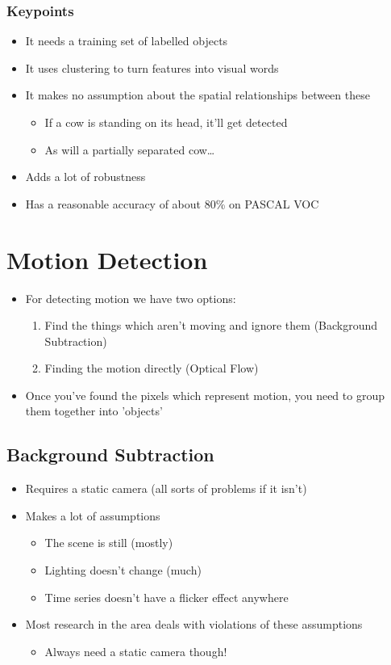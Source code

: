 \documentclass[a4paper]{article}
\begin{document}
\subsubsection{Keypoints}
\label{sec-3-5-1}
\begin{itemize}
\item It needs a training set of labelled objects
\item It uses clustering to turn features into visual words
\item It makes no assumption about the spatial relationships between these
\begin{itemize}
\item If a cow is standing on its head, it'll get detected
\item As will a partially separated cow\ldots{}
\end{itemize}
\item Adds a lot of robustness
\item Has a reasonable accuracy of about 80\% on PASCAL VOC
\end{itemize}

\section{Motion Detection}
\label{sec-4}
\begin{itemize}
\item For detecting motion we have two options:
\begin{enumerate}
\item Find the things which aren't moving and ignore them (Background Subtraction)
\item Finding the motion directly (Optical Flow)
\end{enumerate}
\item Once you've found the pixels which represent motion, you need to group them together into 'objects'
\end{itemize}

\subsection{Background Subtraction}
\label{sec-4-1}
\begin{itemize}
\item Requires a static camera (all sorts of problems if it isn't)
\item Makes a lot of assumptions
\begin{itemize}
\item The scene is still (mostly)
\item Lighting doesn't change (much)
\item Time series doesn't have a flicker effect anywhere
\end{itemize}
\item Most research in the area deals with violations of these assumptions
\begin{itemize}
\item Always need a static camera though!
\end{itemize}
\end{itemize}
\end{document}
